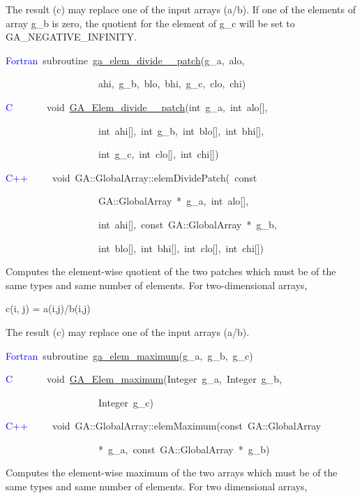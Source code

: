 The result (c) may replace one of the input arrays (a/b). If one of
the elements of array g\_b is zero, the quotient for the element of
g\_c will be set to GA\_NEGATIVE\_INFINITY. 
\begin{lyxcode}
\textcolor{blue}{Fortran}~subroutine~\href{http://www.emsl.pnl.gov/docs/global/ga_ops.html\#ga_elem_divide_patch}{ga\_{}elem\_{}divide\_{}\_{}patch}(g\_a,~alo,~

~~~~~~~~~~~~~~~~~~~ahi,~g\_b,~blo,~bhi,~g\_c,~clo,~chi)~

\textcolor{blue}{C}~~~~~~~void~\href{http://www.emsl.pnl.gov/docs/global/c_nga_ops.html\#ga_elem_divide_patch}{GA\_{}Elem\_{}divide\_{}\_{}patch}(int~g\_a,~int~alo{[}{]},

~~~~~~~~~~~~~~~~~~~int~ahi{[}{]},~int~g\_b,~int~blo{[}{]},~int~bhi{[}{]},~

~~~~~~~~~~~~~~~~~~~int~g\_c,~int~clo{[}{]},~int~chi{[}{]})~

\textcolor{blue}{C++}~~~~~void~GA::GlobalArray::elemDividePatch(~const~

~~~~~~~~~~~~~~~~~~~GA::GlobalArray~{*}~g\_a,~int~alo{[}{]},~

~~~~~~~~~~~~~~~~~~~int~ahi{[}{]},~const~GA::GlobalArray~{*}~g\_b,~

~~~~~~~~~~~~~~~~~~~int~blo{[}{]},~int~bhi{[}{]},~int~clo{[}{]},~int~chi{[}{]})
\end{lyxcode}
Computes the element-wise quotient of the two patches which must be
of the same types and same number of elements. For two-dimensional
arrays,

c(i, j) = a(i,j)/b(i,j)

The result (c) may replace one of the input arrays (a/b). 
\begin{lyxcode}
\textcolor{blue}{Fortran}~subroutine~\href{http://www.emsl.pnl.gov/docs/global/ga_ops.html\#ga_elem_maximum}{ga\_{}elem\_{}maximum}(g\_a,~g\_b,~g\_c)~

\textcolor{blue}{C}~~~~~~~void~\href{http://www.emsl.pnl.gov/docs/global/c_nga_ops.html\#ga_elem_maximum}{GA\_{}Elem\_{}maximum}(Integer~g\_a,~Integer~g\_b,~

~~~~~~~~~~~~~~~~~~~Integer~g\_c)

\textcolor{blue}{C++}~~~~~void~GA::GlobalArray::elemMaximum(const~GA::GlobalArray~

~~~~~~~~~~~~~~~~~~~{*}~g\_a,~const~GA::GlobalArray~{*}~g\_b)
\end{lyxcode}
Computes the element-wise maximum of the two arrays which must be
of the same types and same number of elements. For two dimensional
arrays,

